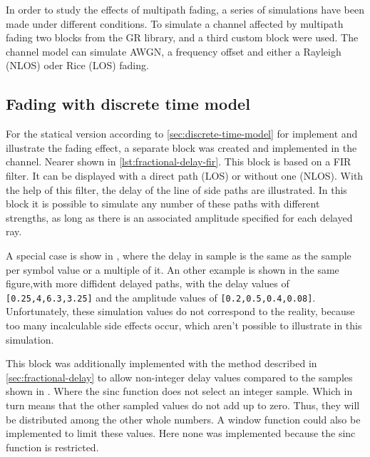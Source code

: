 In order to study the effects of multipath fading, a series of simulations have been made under different conditions. To simulate a channel affected by multipath fading two blocks from the GR library, and a third custom block were used. The channel model can simulate AWGN, a frequency offset and either a Rayleigh (NLOS) oder Rice (LOS) fading.

\subsection{Fading with discrete time model} \label{sec:discrete-time-model-fir}

For the statical version according to \ref{sec:discrete-time-model} for implement and illustrate the fading effect, a separate block was created and implemented in the channel. Nearer shown in \ref{lst:fractional-delay-fir}. This block is based on a FIR filter. It can be displayed with a direct path (LOS) or without one (NLOS).
With the help of this filter, the delay of the line of side paths are illustrated. In this block it is possible to simulate any number of these paths with different strengths, as long as there is an associated amplitude specified for each delayed ray. 

A special case is show in , where the delay in sample is the same as the sample per symbol value or a multiple of it. An other example is shown in the same figure,with more diffident delayed paths, with the delay values of \texttt{[0.25,4,6.3,3.25]} and the amplitude values of \texttt{[0.2,0.5,0.4,0.08]}.
Unfortunately, these simulation values do not correspond to the reality, because too many incalculable side effects occur, which aren't possible to illustrate in this simulation.

This block was additionally implemented with the method described in \ref{sec:fractional-delay} to allow non-integer delay values compared to the samples shown in . Where the sinc function does not select an integer sample. Which in turn means that the other sampled values do not add up to zero.
Thus, they will be distributed among the other whole numbers. A window function could also be implemented to limit these values. Here none was implemented because the sinc function is restricted.

